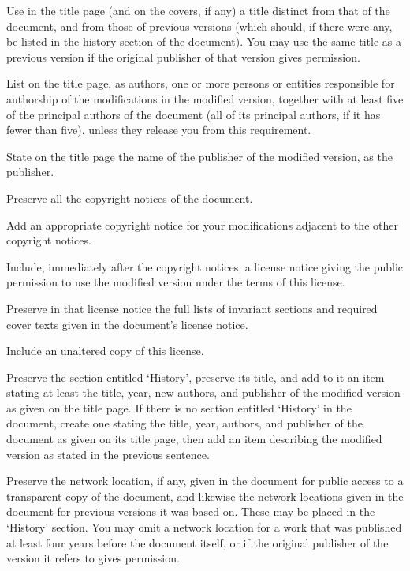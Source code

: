 \begin{multicols}{3}
\begin{anumerate}

\item Use in the title page (and on the covers, if any) a title distinct from that of the document, and from those of previous versions (which should, if there were any, be listed in the history section of the document). You may use the same title as a previous version if the original publisher of that version gives permission.

\item List on the title page, as authors, one or more persons or entities responsible for authorship of the modifications in the modified version, together with at least five of the principal authors of the document (all of its principal authors, if it has fewer than five), unless they release you from this requirement.

\item State on the title page the name of the publisher of the modified version, as the publisher.

\item Preserve all the copyright notices of the document.

\item Add an appropriate copyright notice for your modifications adjacent to the other copyright notices.

\item Include, immediately after the copyright notices, a license notice giving the public permission to use the modified version under the terms of this license.

\item Preserve in that license notice the full lists of invariant sections and required cover texts given in the document's license notice.

\item Include an unaltered copy of this license.

\item Preserve the section entitled \enquote*{History}, preserve its title, and add to it an item stating at least the title, year, new authors, and publisher of the modified version as given on the title page. If there is no section entitled \enquote*{History} in the document, create one stating the title, year, authors, and publisher of the document as given on its title page, then add an item describing the modified version as stated in the previous sentence.

\item Preserve the network location, if any, given in the document for public access to a transparent copy of the document, and likewise the network locations given in the document for previous versions it was based on. These may be placed in the \enquote*{History} section. You may omit a network location for a work that was published at least four years before the document itself, or if the original publisher of the version it refers to gives permission.


\end{anumerate}
\end{multicols}
